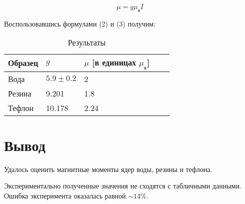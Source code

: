 \documentclass[a4paper, 14pt]{article}
\begin{document}
\begin{equation}
    \mu = g  \mu_{\text{я}} I
\end{equation}

Воспользовавшись формулами (2) и (3) получим:

\begin{table}[hbtp]
    \begin{center}
    
    \begin{tabular}{|l|l|l|l|l|}
    \hline
    Образец & $g$  & $\mu$ [в единицах $\mu_{\text{я}}$]   \\ \hline
    Вода    & $5.9 \pm 0.2$    & 2          \\ \hline
    Резина  & 9.201           & 1.8            \\ \hline
    Тефлон  & 10.178          & 2.24            \\ \hline
    \end{tabular}
    \caption{Результаты}
    \label{table:end}
\end{center}
\end{table}


\section*{\textcolor{header}{Вывод}}

Удалось оценить магнитные моменты ядер воды, резины и тефлона. 

Экспериментально полученные значения не сходятся с табличными данными.
Ошибка эксперимента оказалась равной $\sim 14 \%$. 
\end{document}
